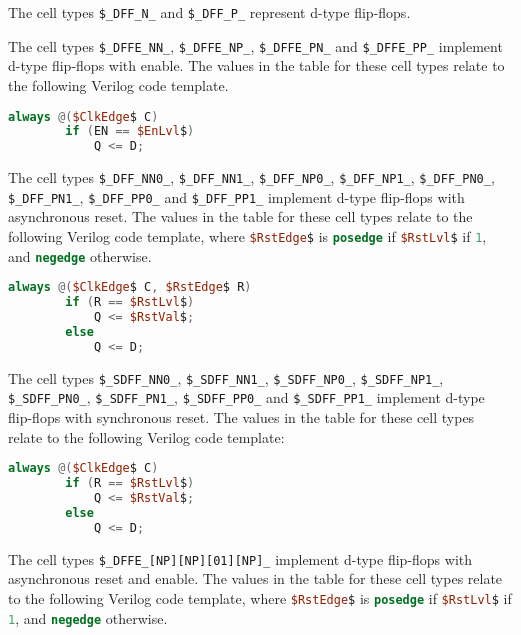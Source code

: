 The cell types {\tt \$\_DFF\_N\_} and {\tt \$\_DFF\_P\_} represent d-type flip-flops.

The cell types {\tt \$\_DFFE\_NN\_}, {\tt \$\_DFFE\_NP\_}, {\tt \$\_DFFE\_PN\_} and {\tt \$\_DFFE\_PP\_}
implement d-type flip-flops with enable. The values in the table for these cell types relate to the
following Verilog code template.

\begin{lstlisting}[mathescape,language=Verilog]
	always @($ClkEdge$ C)
		if (EN == $EnLvl$)
			Q <= D;
\end{lstlisting}

The cell types {\tt \$\_DFF\_NN0\_}, {\tt \$\_DFF\_NN1\_}, {\tt \$\_DFF\_NP0\_}, {\tt \$\_DFF\_NP1\_},
{\tt \$\_DFF\_PN0\_}, {\tt \$\_DFF\_PN1\_}, {\tt \$\_DFF\_PP0\_} and {\tt \$\_DFF\_PP1\_} implement
d-type flip-flops with asynchronous reset. The values in the table for these cell types relate to the
following Verilog code template, where \lstinline[mathescape,language=Verilog];$RstEdge$; is \lstinline[language=Verilog];posedge;
if \lstinline[mathescape,language=Verilog];$RstLvl$; if \lstinline[language=Verilog];1;, and \lstinline[language=Verilog];negedge;
otherwise.

\begin{lstlisting}[mathescape,language=Verilog]
	always @($ClkEdge$ C, $RstEdge$ R)
		if (R == $RstLvl$)
			Q <= $RstVal$;
		else
			Q <= D;
\end{lstlisting}

The cell types {\tt \$\_SDFF\_NN0\_}, {\tt \$\_SDFF\_NN1\_}, {\tt \$\_SDFF\_NP0\_}, {\tt \$\_SDFF\_NP1\_},
{\tt \$\_SDFF\_PN0\_}, {\tt \$\_SDFF\_PN1\_}, {\tt \$\_SDFF\_PP0\_} and {\tt \$\_SDFF\_PP1\_} implement
d-type flip-flops with synchronous reset. The values in the table for these cell types relate to the
following Verilog code template:

\begin{lstlisting}[mathescape,language=Verilog]
	always @($ClkEdge$ C)
		if (R == $RstLvl$)
			Q <= $RstVal$;
		else
			Q <= D;
\end{lstlisting}

The cell types {\tt \$\_DFFE\_[NP][NP][01][NP]\_} implement
d-type flip-flops with asynchronous reset and enable.  The values in the table for these cell types relate to the
following Verilog code template, where \lstinline[mathescape,language=Verilog];$RstEdge$; is \lstinline[language=Verilog];posedge;
if \lstinline[mathescape,language=Verilog];$RstLvl$; if \lstinline[language=Verilog];1;, and \lstinline[language=Verilog];negedge;
otherwise.

